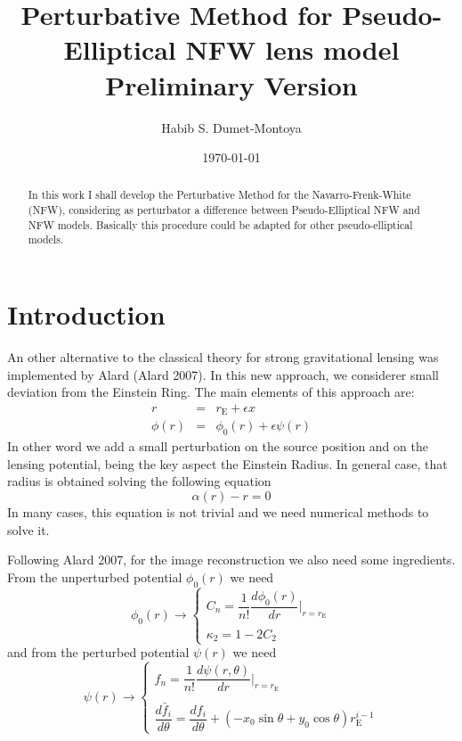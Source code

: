 \documentclass[a4paper,twoside]{article}
\def \re {r_{\mathrm{E}}}
\def \po {\phi_0}
\def \al {\alpha}
\def \te {\theta}
\begin{document}
\title{Perturbative Method for Pseudo-Elliptical NFW lens model\\ Preliminary Version}
%
\author{Habib S. Dumet-Montoya}
\begin{abstract}
In this work I shall develop the Perturbative Method  for the Navarro-Frenk-White (NFW), considering as perturbator a difference between Pseudo-Elliptical NFW and NFW models. Basically this procedure could be adapted for other pseudo-elliptical models.
\end{abstract}

\date{\today}
\maketitle

\section{Introduction}
An other alternative to the classical theory for strong gravitational lensing was implemented by Alard (Alard 2007). In this new approach, we  considerer small deviation from the Einstein Ring. The main elements of this approach are:
\begin{eqnarray*}
r&=&\re +\epsilon x\\
\phi(r)&=&\po(r)+\epsilon\psi(r)
\end{eqnarray*}
In other word we add a small perturbation on the source position and on the lensing potential, being the key aspect the Einstein Radius.  
In  general case, that radius is obtained solving the following equation
\begin{equation}
\al(r)-r=0
\label{reeq}
\end{equation}
In many cases, this equation is not trivial and we need numerical methods to solve it.

Following Alard 2007, for the image reconstruction we also need some ingredients.
From the unperturbed potential $\po(r)$ we need
\begin{equation}
\po(r) \rightarrow \left\{
\begin{array}{l}
C_n=\dfrac{1}{n!}\dfrac{d\po(r)}{dr}{\Big|_{r=\re}}\\
\\
\kappa_2=1-2C_2 
\end{array}\right.
\label{nfwcis}
\end{equation}
and from the perturbed potential $\psi(r)$ we need
\begin{equation}
\psi(r) \rightarrow \left\{
\begin{array}{l}
f_n=\dfrac{1}{n!}\dfrac{d\psi(r,\te)}{dr}{\Big|_{r=\re}}\\
\\
\dfrac{d\bar{f}_i}{d\te}=\dfrac{d f_i}{d\te}+\left(-x_0\sin{\te}+y_0\cos{\te}\right)\re^{i-1}
\end{array}\right.
\label{nfwfis}
\end{equation}
\end{document}
